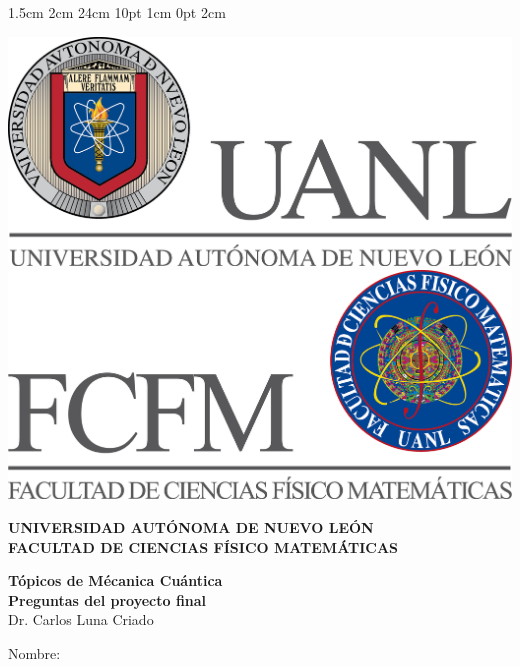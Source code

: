 \documentclass[12pt,letterpaper]{report}
\begin{document}
\setmargins{2.5cm}      
{1.5cm}                     
{2cm}  
{24cm}                    
{10pt}                          
{1cm}                          
{0pt}                             
{2cm}
\begin{titlepage}
\begin{center}
\includegraphics[scale=0.40]{../../Logos/uanl.png} 
\hspace{2.5cm}
\includegraphics[scale=0.40]{../../Logos/fcfm.png}
\end{center}
\vspace{2cm}
\begin{center}
\textbf{
UNIVERSIDAD AUTÓNOMA DE NUEVO LEÓN\\
FACULTAD DE CIENCIAS
    FÍSICO MATEMÁTICAS}\\
\vspace*{2cm}
\begin{large}
\vspace{1cm}
\large{\textbf{Tópicos de Mécanica Cuántica}}\\
\textbf{Preguntas del proyecto final}\\
Dr. Carlos Luna Criado\\
\end{large}
\vspace{3.5cm}
\begin{minipage}{0.6\linewidth}
\changefontsizes{14pt}
Nombre:\\                                                                                                                                                                                                                                                           

\end{minipage}
\end{center}
\end{titlepage}
\end{document}
